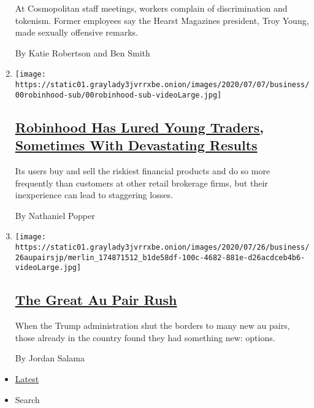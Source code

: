 \begin{enumerate}
  At Cosmopolitan staff meetings, workers complain of discrimination and
  tokenism. Former employees say the Hearst Magazines president, Troy
  Young, made sexually offensive remarks.

  By Katie Robertson and Ben Smith
\item
  \texttt{[image: https://static01.graylady3jvrrxbe.onion/images/2020/07/07/business/00robinhood-sub/00robinhood-sub-videoLarge.jpg]}

  \hypertarget{robinhood-has-lured-young-traders-sometimes-with-devastating-results}{%
  \subsection{\texorpdfstring{\href{/2020/07/08/technology/robinhood-risky-trading.html}{Robinhood
  Has Lured Young Traders, Sometimes With Devastating
  Results}}{Robinhood Has Lured Young Traders, Sometimes With Devastating Results}}\label{robinhood-has-lured-young-traders-sometimes-with-devastating-results}}

  Its users buy and sell the riskiest financial products and do so more
  frequently than customers at other retail brokerage firms, but their
  inexperience can lead to staggering losses.

  By Nathaniel Popper
\item
  \texttt{[image: https://static01.graylady3jvrrxbe.onion/images/2020/07/26/business/26aupairsjp/merlin\_174871512\_b1de58df-100c-4682-881e-d26acdceb4b6-videoLarge.jpg]}

  \hypertarget{the-great-au-pair-rush}{%
  \subsection{\texorpdfstring{\href{/2020/07/25/business/the-great-au-pair-rush.html}{The
  Great Au Pair
  Rush}}{The Great Au Pair Rush}}\label{the-great-au-pair-rush}}

  When the Trump administration shut the borders to many new au pairs,
  those already in the country found they had something new: options.

  By Jordan Salama
\end{enumerate}

\begin{itemize}
\tightlist
\item
  \protect\hyperlink{stream-panel}{Latest}
\item
  Search
\end{itemize}

